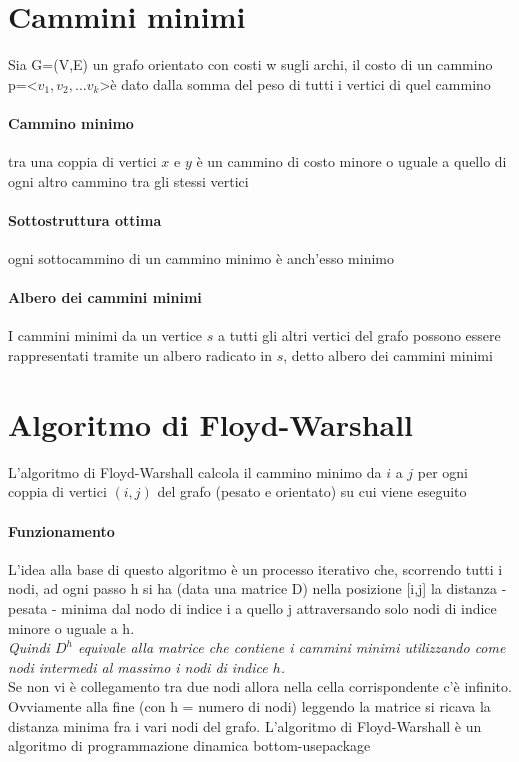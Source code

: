 \documentclass[12pt, a4paper, openany]{book}
\begin{document}
\section{Cammini minimi}

Sia G=(V,E) un grafo orientato con costi w sugli archi,
il costo di un cammino p=\textless$ v_1,v_2,...v_k$\textgreater è dato
dalla somma del peso di tutti i vertici di quel cammino

\paragraph*{Cammino minimo}
tra una coppia di vertici $x$ e $y$ è un cammino di costo
minore o uguale a quello di ogni altro cammino tra gli stessi vertici

\paragraph*{Sottostruttura ottima}
ogni sottocammino di un cammino minimo è anch'esso minimo

\paragraph*{Albero dei cammini minimi}
I cammini minimi da un vertice $s$ a tutti gli altri vertici del grafo possono
essere rappresentati tramite un albero radicato in $s$, detto albero dei cammini minimi

\section{Algoritmo di Floyd-Warshall}
L'algoritmo di Floyd-Warshall calcola il cammino minimo da $i$ a $j$ per ogni coppia di vertici $(i,j)$ del grafo (pesato e orientato) su cui viene eseguito

\paragraph{Funzionamento}
L'idea alla base di questo algoritmo è un processo iterativo che, scorrendo tutti i nodi, ad ogni passo h si ha
(data una matrice D) nella posizione [i,j] la distanza - pesata - minima dal nodo di indice i a quello j attraversando
solo nodi di indice minore o uguale a h.\\
\textit{Quindi $D^h$ equivale alla matrice che contiene i cammini minimi utilizzando come nodi intermedi al massimo i nodi di indice $h$.}
\\Se non vi è collegamento tra due nodi allora nella cella corrispondente c'è infinito.
Ovviamente alla fine (con h = numero di nodi) leggendo la matrice si ricava la distanza minima fra i vari nodi del grafo.
L'algoritmo di Floyd-Warshall è un algoritmo di programmazione dinamica bottom-usepackage
\end{document}
